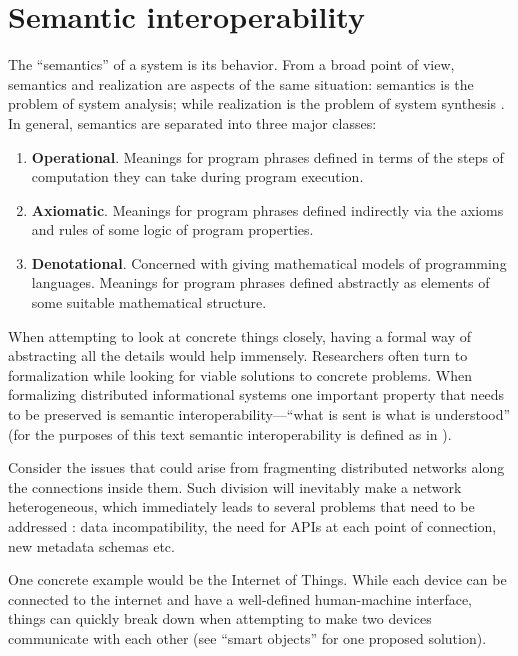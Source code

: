 \documentclass{article}
\begin{document}
\section*{Semantic interoperability}

The “semantics” of a system is its behavior. From a broad point of view, semantics and
realization are aspects of the same situation: semantics is the problem of system analysis; while
realization is the problem of system synthesis \cite{Goguen1}. In general, semantics are separated into three
major classes:
\begin{enumerate}
    \item \textbf{Operational}. Meanings for program phrases defined in terms of the steps of
    computation they can take during program execution.
    \item \textbf{Axiomatic}. Meanings for program phrases defined indirectly via the axioms and rules
    of some logic of program properties.
    \item \textbf{Denotational}. Concerned with giving mathematical models of programming
    languages. Meanings for program phrases defined abstractly as elements of some
    suitable mathematical structure.
\end{enumerate}
When attempting to look at concrete things closely, having a formal way of abstracting all
the details would help immensely. Researchers often turn to formalization while looking for viable
solutions to concrete problems. When formalizing distributed informational systems one important
property that needs to be preserved is semantic interoperability---“what is sent is what is
understood” (for the purposes of this text semantic interoperability is defined as in \cite{Miscena}).

Consider the issues that could arise from fragmenting distributed networks along the
connections inside them. Such division will inevitably make a network heterogeneous, which
immediately leads to several problems that need to be addressed \cite{Mello}: data incompatibility, the
need for APIs at each point of connection, new metadata schemas etc.

One concrete example would be the Internet of Things. While each device can be connected
to the internet and have a well-defined human-machine interface, things can quickly break down
when attempting to make two devices communicate with each other (see “smart objects” \cite{Novo} for
one proposed solution).
\end{document}
